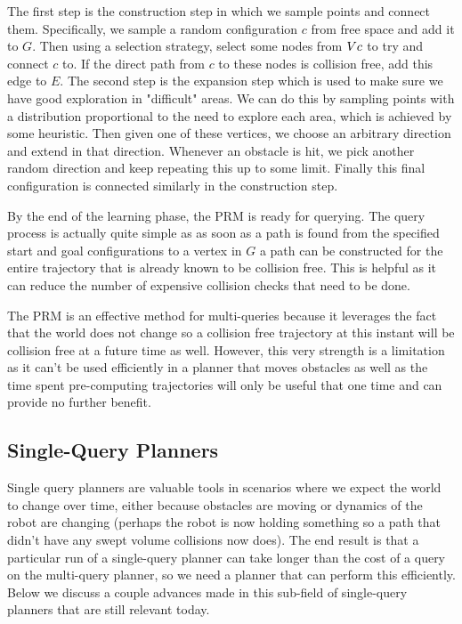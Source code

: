 The first step is the construction step in which we sample points and connect them. Specifically, we sample a random configuration $c$ from free space and add it to $G$. Then using a selection strategy, select some nodes from $V\\c$ to try and connect $c$ to. If the direct path from $c$ to these nodes is collision free, add this edge to $E$. The second step is the expansion step which is used to make sure we have good exploration in "difficult" areas. We can do this by sampling points with a distribution proportional to the need to explore each area, which is achieved by some heuristic. Then given one of these vertices, we choose an arbitrary direction and extend in that direction. Whenever an obstacle is hit, we pick another random direction and keep repeating this up to some limit. Finally this final configuration is connected similarly in the construction step. 

By the end of the learning phase, the PRM is ready for querying. The query process is actually quite simple as as soon as a path is found from the specified start and goal configurations to a vertex in $G$ a path can be constructed for the entire trajectory that is already known to be collision free. This is helpful as it can reduce the number of expensive collision checks that need to be done. 

The PRM is an effective method for multi-queries because it leverages the fact that the world does not change so a collision free trajectory at this instant will be collision free at a future time as well. However, this very strength is a limitation as it can't be used efficiently in a planner that moves obstacles as well as the time spent pre-computing trajectories will only be useful that one time and can provide no further benefit.

\subsection{Single-Query Planners}
Single query planners are valuable tools in scenarios where we expect the world to change over time, either because obstacles are moving or dynamics of the robot are changing (perhaps the robot is now holding something so a path that didn't have any swept volume collisions now does). The end result is that a particular run of a single-query planner can take longer than the cost of a query on the multi-query planner, so we need a planner that can perform this efficiently. Below we discuss a couple advances made in this sub-field of single-query planners that are still relevant today.

